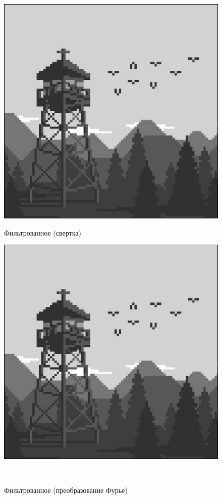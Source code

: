 \documentclass[a4paper]{article}
\begin{document}
\begin{figure}[H]
    \begin{minipage}{0.49\textwidth}
        \centering \includegraphics[width=\textwidth]{2/3_img_gaussian_by_conv2.png}
        \caption{Фильтрованное (свертка)}
    \end{minipage}\hfill
    \begin{minipage}{0.49\textwidth}
        \centering \includegraphics[width=\textwidth]{2/3_img_gaussian_by_fourier.png}
        \caption{Фильтрованное (преобразование Фурье)}
    \end{minipage}\\[1em]
\end{figure}\noindent\
\end{document}
